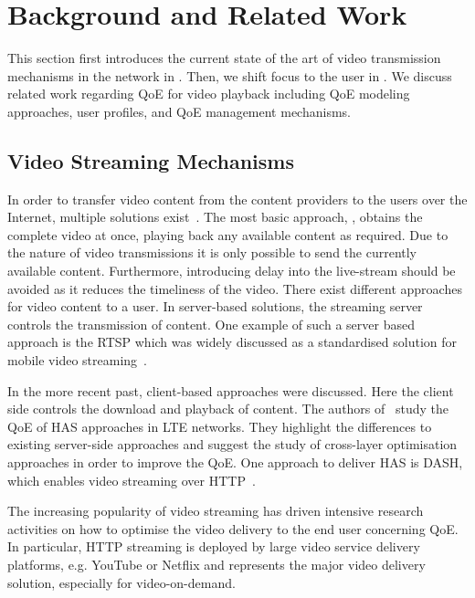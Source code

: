 \section{Background and Related Work}\label{sec:application:background}
This section first introduces the current state of the art of video transmission mechanisms in the network in .
Then, we shift focus to the user in .
We discuss related work regarding \gls{QoE} for video playback including \gls{QoE} modeling approaches, user profiles, and \gls{QoE} management mechanisms.

\subsection{Video Streaming Mechanisms}\label{sec:application:background:video_streaming_mechanisms}
In order to transfer video content from the content providers to the users over the Internet, multiple solutions exist~\cite{Begen2011}.
The most basic approach, \emph{\download}, obtains the complete video at once, playing back any available content as required.
Due to the nature of \emph{\live} video transmissions it is only possible to send the currently available content.
Furthermore, introducing delay into the live-stream should be avoided as it reduces the timeliness of the video.
There exist different approaches for \emph{\streaming} video content to a user.
In server-based solutions, the streaming server controls the transmission of content.
One example of such a server based approach is the \gls{RTSP} which was widely discussed as a standardised solution for mobile video streaming~\cite{Elsen2001}.

In the more recent past, client-based approaches were discussed.
Here the client side controls the download and playback of content.
The authors of~\cite{Oyman2012} study the \gls{QoE} of \gls{HAS} approaches in \gls{LTE} networks.
They highlight the differences to existing server-side approaches and suggest the study of cross-layer optimisation approaches in order to improve the \gls{QoE}.
One approach to deliver \gls{HAS} is \gls{DASH}, which enables video streaming over \gls{HTTP}~\cite{Sodagar2011}.

The increasing popularity of video streaming has driven intensive research activities on how to optimise the video delivery to the end user concerning \gls{QoE}.
In particular, \gls{HTTP} streaming is deployed by large video service delivery platforms, e.g. YouTube or Netflix and represents the major video delivery solution, especially for video-on-demand.


